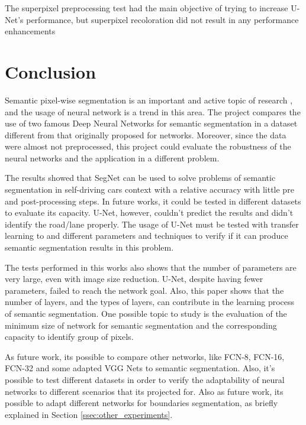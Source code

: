 \documentclass[10pt,twocolumn,letterpaper]{article}
\begin{document}
The superpixel preprocessing test had the main objective of trying to increase U-Net's performance, but superpixel recoloration did not result in any performance enhancements

\section{Conclusion} \label{sec:conclusion}


Semantic pixel-wise segmentation is an important and active topic of research \cite{SEGNET}, and the usage of neural network is a trend in this area. The project compares the use of two famous Deep Neural Networks for semantic segmentation in a dataset different from that originally proposed for networks. Moreover, since the data were almost not preprocessed, this project could evaluate the robustness of the neural networks and the application in a different problem.

The results showed that SegNet can be used to solve problems of semantic segmentation in self-driving cars context with a relative accuracy with little pre and post-processing steps. In future works, it could be tested in different datasets to evaluate its capacity. U-Net, however, couldn't predict the results and didn't identify the road/lane properly. The usage of U-Net must be tested with transfer learning to and different parameters and techniques to verify if it can produce semantic segmentation results in this problem.

The tests performed in this works also shows that the number of parameters are very large, even with image size reduction. U-Net, despite having fewer parameters, failed to reach the network goal. Also, this paper shows that the number of layers, and the types of layers, can contribute in the learning process of semantic segmentation. One possible topic to study is the evaluation of the minimum size of network for semantic segmentation and the corresponding capacity to identify group of pixels.

As future work, its possible to compare other networks, like FCN-8, FCN-16, FCN-32 \cite{FULLY_CONVOLU} and some adapted VGG Nets \cite{VGGNET} to semantic segmentation. Also, it's possible to test different datasets in order to verify the adaptability of neural networks to different scenarios that its projected for. Also as future work, its possible to adapt different networks for boundaries segmentation, as briefly explained in Section \ref{ssec:other_experiments}.
\end{document}
